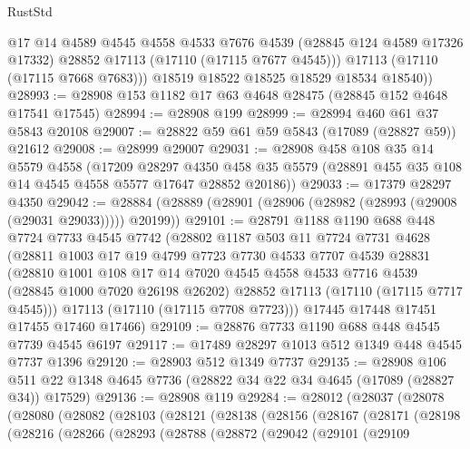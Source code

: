 \begin{lexlean}{RustStd}
\begin{coremodule}
            @17
            @14
            @4589
            @4545
            @4558
            @4533
            @7676
            @4539
            (@28845 @124 @4589 @17326 @17332)
            @28852
            @17113
            (@17110 (@17115 @7677 @4545)))
          @17113
          (@17110 (@17115 @7668 @7683)))
        @18519
        @18522
        @18525
        @18529
        @18534
        @18540))
@28993 := @28908 @153 @1182 @17 @63 @4648 @28475 (@28845 @152 @4648 @17541 @17545)
@28994 := @28908 @199
@28999 := @28994 @460 @61 @37 @5843 @20108
@29007 := @28822 @59 @61 @59 @5843 (@17089 (@28827 @59)) @21612
@29008 := @28999 @29007
@29031 := @28908
    @458
    @108
    @35
    @14
    @5579
    @4558
    (@17209
      @28297
      @4350
      @458
      @35
      @5579
      (@28891 @455 @35 @108 @14 @4545 @4558 @5577 @17647 @28852 @20186))
@29033 := @17379 @28297 @4350
@29042 := @28884 (@28889 (@28901 (@28906 (@28982 (@28993 (@29008 (@29031 @29033))))) @20199))
@29101 := @28791
    @1188
    @1190
    @688
    @448
    @7724
    @7733
    @4545
    @7742
    (@28802
      @1187
      @503
      @11
      @7724
      @7731
      @4628
      (@28811
        @1003
        @17
        @19
        @4799
        @7723
        @7730
        @4533
        @7707
        @4539
        @28831
        (@28810
          @1001
          @108
          @17
          @14
          @7020
          @4545
          @4558
          @4533
          @7716
          @4539
          (@28845 @1000 @7020 @26198 @26202)
          @28852
          @17113
          (@17110 (@17115 @7717 @4545)))
        @17113
        (@17110 (@17115 @7708 @7723)))
      @17445
      @17448
      @17451
      @17455
      @17460
      @17466)
@29109 := @28876 @7733 @1190 @688 @448 @4545 @7739 @4545 @6197
@29117 := @17489 @28297 @1013 @512 @1349 @448 @4545 @7737 @1396
@29120 := @28903 @512 @1349 @7737
@29135 := @28908
    @106
    @511
    @22
    @1348
    @4645
    @7736
    (@28822 @34 @22 @34 @4645 (@17089 (@28827 @34)) @17529)
@29136 := @28908 @119
@29284 := @28012
    (@28037
      (@28078
        (@28080
          (@28082
            (@28103
              (@28121
                (@28138
                  (@28156
                    (@28167
                      (@28171
                        (@28198
                          (@28216
                            (@28266
                              (@28293
                                (@28788
                                  (@28872
                                    (@29042
                                      (@29101
                                        (@29109

\end{coremodule}
\end{lexlean}
